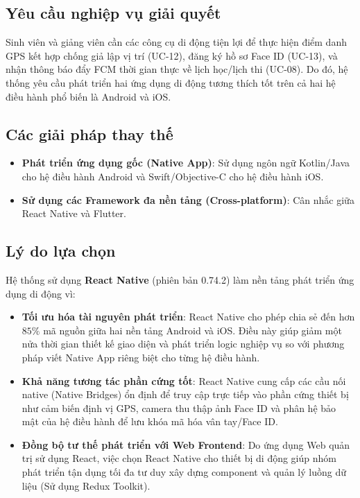 \documentclass[../DoAn.tex]{subfiles}
\begin{document}
\subsection{Yêu cầu nghiệp vụ giải quyết}
Sinh viên và giảng viên cần các công cụ di động tiện lợi để thực hiện điểm danh GPS kết hợp chống giả lập vị trí (UC-12), đăng ký hồ sơ Face ID (UC-13), và nhận thông báo đẩy FCM thời gian thực về lịch học/lịch thi (UC-08). Do đó, hệ thống yêu cầu phát triển hai ứng dụng di động tương thích tốt trên cả hai hệ điều hành phổ biến là Android và iOS.

\subsection{Các giải pháp thay thế}
\begin{itemize}
    \item \textbf{Phát triển ứng dụng gốc (Native App)}: Sử dụng ngôn ngữ Kotlin/Java cho hệ điều hành Android và Swift/Objective-C cho hệ điều hành iOS.
    \item \textbf{Sử dụng các Framework đa nền tảng (Cross-platform)}: Cân nhắc giữa React Native và Flutter.
\end{itemize}

\subsection{Lý do lựa chọn}
Hệ thống sử dụng \textbf{React Native} (phiên bản 0.74.2) làm nền tảng phát triển ứng dụng di động vì:
\begin{itemize}
    \item \textbf{Tối ưu hóa tài nguyên phát triển}: React Native cho phép chia sẻ đến hơn $85\%$ mã nguồn giữa hai nền tảng Android và iOS. Điều này giúp giảm một nửa thời gian thiết kế giao diện và phát triển logic nghiệp vụ so với phương pháp viết Native App riêng biệt cho từng hệ điều hành.
    \item \textbf{Khả năng tương tác phần cứng tốt}: React Native cung cấp các cầu nối native (Native Bridges) ổn định để truy cập trực tiếp vào phần cứng thiết bị như cảm biến định vị GPS, camera thu thập ảnh Face ID và phân hệ bảo mật của hệ điều hành để lưu khóa mã hóa vân tay/Face ID.
    \item \textbf{Đồng bộ tư thế phát triển với Web Frontend}: Do ứng dụng Web quản trị sử dụng React, việc chọn React Native cho thiết bị di động giúp nhóm phát triển tận dụng tối đa tư duy xây dựng component và quản lý luồng dữ liệu (Sử dụng Redux Toolkit).
\end{itemize}
\end{document}
